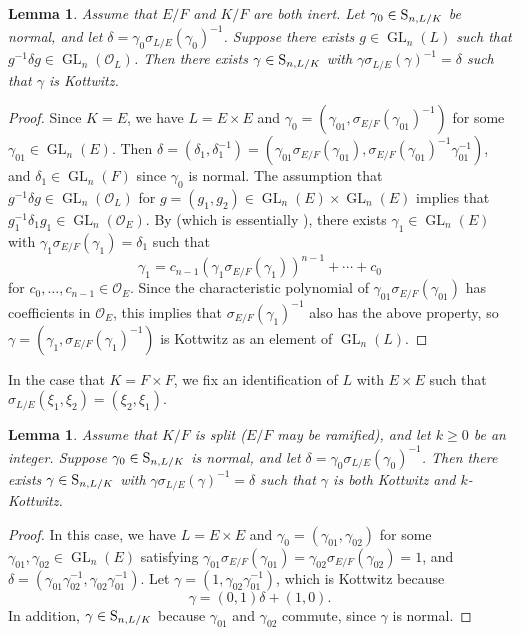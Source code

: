 \documentclass[11pt, reqno]{amsart}
\numberwithin{equation}{subsection}
\theoremstyle{plain}
\newtheorem{lem}[proposition]{Lemma}
\theoremstyle{definition}
\renewcommand{\O}{\mathcal O}
\renewcommand{\S}{\textnormal{S}}
\DeclareMathOperator{\GL}{GL}
\begin{document}
\begin{lem}
\label{lem:kottwitzexist}
Assume that $E/F$ and $K/F$ are both inert.
Let $\gamma_0 \in \S_{n,L/K}$ be normal, and let
$\delta = \gamma_0\sigma_{L/E}(\gamma_0)^{-1}$.
Suppose there exists $g \in \GL_n(L)$ such that
$g^{-1}\delta g \in \GL_n(\O_{L})$. 
Then there exists $\gamma \in \S_{n,L/K}$ with 
$\gamma\sigma_{L/E}(\gamma)^{-1} = \delta$ such
that $\gamma$ is Kottwitz.
\end{lem}
\begin{proof}
  Since $K = E$, we have $L = E \times E$ 
  and $\gamma_0 = (\gamma_{01}, \sigma_{E/F}(\gamma_{01})^{-1})$
  for some $\gamma_{01} \in \GL_n(E)$.
  Then $\delta = (\delta_1, \delta_1^{-1})
  = (\gamma_{01}\sigma_{E/F}(\gamma_{01}),
  \sigma_{E/F}(\gamma_{01})^{-1}\gamma_{01}^{-1})$,
  and $\delta_1 \in \GL_n(F)$ since $\gamma_0$ is normal.
  The assumption that 
  $g^{-1}\delta g \in \GL_n(\O_{L})$ for $g = (g_1, g_2) \in
  \GL_n(E) \times \GL_n(E)$ implies that
  $g_1^{-1} \delta_1 g_1
  \in \GL_n(\O_{E})$.
  By {\cite[Lemma 5.4]{TGGP-Wang}} (which is essentially
  {\cite[Lemma 8.8]{Kottwitz1980}}), there exists   
  $\gamma_1 \in \GL_n(E)$ with 
  $\gamma_1\sigma_{E/F}(\gamma_1) = \delta_1$
  such that
  \[
    \gamma_1 = 
    c_{n-1}(\gamma_1\sigma_{E/F}(\gamma_1))^{n-1} 
    + \cdots + c_0
  \]
  for $c_0, \dots, c_{n-1} \in \O_{E}$.
  Since the characteristic polynomial of
  $\gamma_{01}\sigma_{E/F}(\gamma_{01})$ has coefficients
  in $\O_{E}$, this implies that
  $\sigma_{E/F}(\gamma_1)^{-1}$ also has the above
  property,
  so $\gamma = (\gamma_1, \sigma_{E/F}(\gamma_1)^{-1})$
  is Kottwitz as an element of $\GL_n(L)$.
\end{proof}

In the case that $K = F \times F$, we fix an
identification of $L$ with $E \times E$ such
that $\sigma_{L/E}(\xi_1, \xi_2) = (\xi_2, \xi_1)$.

\begin{lem}
\label{lem:kkottwitzexist}
Assume that $K/F$ is split ($E/F$ may be ramified), 
and let $k \ge 0$ be an integer. 
Suppose $\gamma_0 \in \S_{n,L/K}$ is normal,
and let $\delta = \gamma_0\sigma_{L/E}(\gamma_0)^{-1}$.
Then there exists $\gamma \in \S_{n,L/K}$ with
$\gamma\sigma_{L/E}(\gamma)^{-1} = \delta$ such
that $\gamma$ is both Kottwitz and $k$-Kottwitz.
\end{lem} 
\begin{proof}
In this case, we have $L = E \times E$ and 
$\gamma_0 = (\gamma_{01}, \gamma_{02})$ for some
$\gamma_{01}, \gamma_{02} \in \GL_n(E)$ satisfying
$\gamma_{01}\sigma_{E/F}(\gamma_{01}) 
= \gamma_{02}\sigma_{E/F}(\gamma_{02}) = 1$,
and $\delta = (\gamma_{01}\gamma_{02}^{-1},
\gamma_{02}\gamma_{01}^{-1})$.
Let $\gamma = (1, \gamma_{02}\gamma_{01}^{-1})$,
which is Kottwitz because
\[
    \gamma = (0, 1)\delta + (1, 0).
\]
In addition, $\gamma \in \S_{n,L/K}$ because
$\gamma_{01}$ and $\gamma_{02}$ commute, since
$\gamma$ is normal.
\end{proof}
\end{document}
